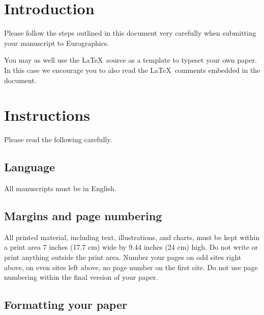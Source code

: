 \documentclass{egpubl}
\begin{document}
\section{Introduction}

Please follow the steps outlined in this document very carefully when
submitting your manuscript to Eurographics.

You may as well use the \LaTeX\ source as a template to typeset your own
paper. In this case we encourage you to also read the \LaTeX\ comments
embedded in the document.

\section{Instructions}

Please read the following carefully.

\subsection{Language}

All manuscripts must be in English.

\subsection{Margins and page numbering}

All printed material, including text, illustrations, and charts,
must be kept within a print area %
7 inches (17.7 cm) wide by
9.44 inches (24 cm) high. Do not write or print anything
outside the print area. Number your pages on odd sites right
above, on even sites left above, no page number on the first site.
Do not use page numbering within the final version of your paper.


\subsection{Formatting your paper}

% 
\end{document}
